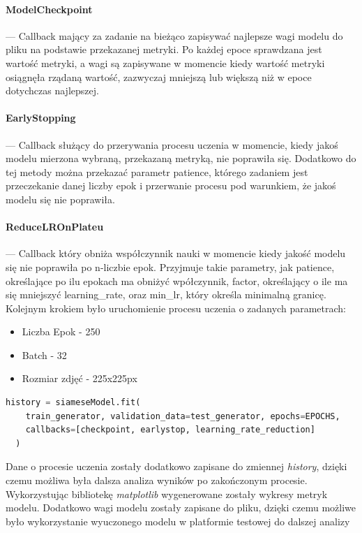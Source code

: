 \paragraph{ModelCheckpoint} --- Callback mający za zadanie na bieżąco zapisywać najlepsze wagi modelu do pliku na podstawie przekazanej metryki. Po każdej epoce sprawdzana jest wartość metryki, a wagi są zapisywane w momencie kiedy wartość metryki osiągnęła rządaną wartość, zazwyczaj mniejszą lub większą niż w epoce dotychczas najlepszej.  
\paragraph{EarlyStopping} --- Callback służący do przerywania procesu uczenia w momencie, kiedy jakoś modelu mierzona wybraną, przekazaną metryką, nie poprawiła się. Dodatkowo do tej metody można przekazać parametr patience, którego zadaniem jest przeczekanie danej liczby epok i przerwanie procesu pod warunkiem, że jakoś modelu się nie poprawiła.
\paragraph{ReduceLROnPlateu} --- Callback który obniża współczynnik nauki w momencie kiedy jakość modelu się nie poprawiła po n-liczbie epok. Przyjmuje takie parametry, jak patience, określające po ilu epokach ma obniżyć wpółczynnik, factor, określający o ile ma się mniejszyć learning\_rate, oraz min\_lr, który określa minimalną granicę.
Kolejnym krokiem było uruchomienie procesu uczenia o zadanych parametrach:
\begin{itemize}
  \item Liczba Epok - 250
  \item Batch - 32
  \item Rozmiar zdjęć - 225x225px
\end{itemize}
\begin{lstlisting}[language=Python]
  history = siameseModel.fit(
    train_generator, validation_data=test_generator, epochs=EPOCHS, 
    callbacks=[checkpoint, earlystop, learning_rate_reduction]
  )
\end{lstlisting}
Dane o procesie uczenia zostały dodatkowo zapisane do zmiennej \emph{history}, dzięki czemu możliwa była dalsza analiza wyników po zakończonym procesie. Wykorzystując bibliotekę \emph{matplotlib} wygenerowane zostały wykresy metryk modelu. Dodatkowo wagi modelu zostały zapisane do pliku, dzięki czemu możliwe było wykorzystanie wyuczonego modelu w platformie testowej do dalszej analizy


